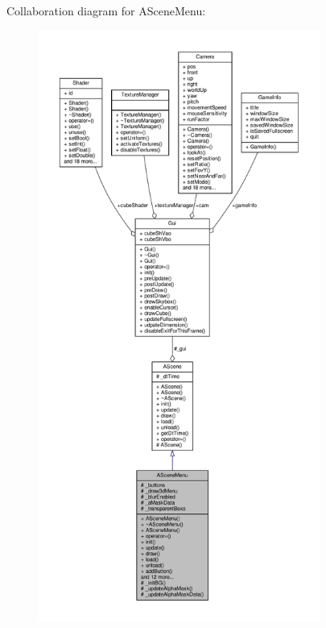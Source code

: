 Collaboration diagram for A\+Scene\+Menu\+:
\nopagebreak
\begin{figure}[H]
\begin{center}
\leavevmode
\includegraphics[height=550pt]{class_a_scene_menu__coll__graph}
\end{center}
\end{figure}

